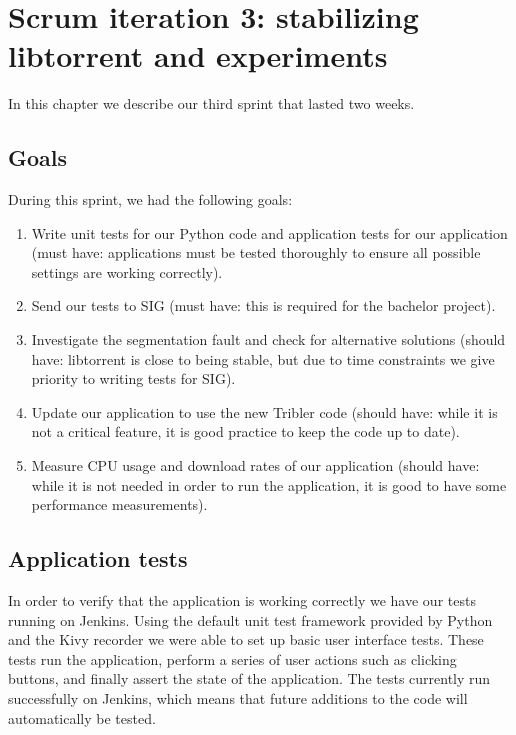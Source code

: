 \chapter{Scrum iteration 3: stabilizing libtorrent and experiments}
\label{cpt:iteration3}
	In this chapter we describe our third sprint that lasted two weeks.

	\section{Goals}
		During this sprint, we had the following goals:
	
		\begin{enumerate}
			\item Write unit tests for our Python code and application tests for our application (must have: applications must be tested thoroughly to ensure all possible settings are working correctly). 
			\item Send our tests to SIG (must have: this is required for the bachelor project).
			\item Investigate the segmentation fault and check for alternative solutions (should have: libtorrent is close to being stable, but due to time constraints we give priority to writing tests for SIG).
			\item Update our application to use the new Tribler code (should have: while it is not a critical feature, it is good practice to keep the code up to date).
			\item Measure CPU usage and download rates of our application (should have: while it is not needed in order to run the application, it is good to have some performance measurements).
		\end{enumerate}
		
	\section{Application tests}
		In order to verify that the application is working correctly we have our tests running on Jenkins. Using the default unit test framework provided by Python and the Kivy recorder we were able to set up basic user interface tests. These tests run the application, perform a series of user actions such as clicking buttons, and finally assert the state of the application. The tests currently run successfully on Jenkins, which means that future additions to the code will automatically be tested.
		
